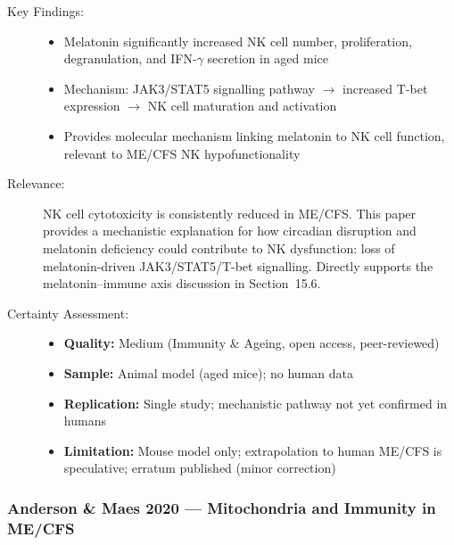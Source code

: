 \begin{description}
    \item[Key Findings:]
    \begin{itemize}
        \item Melatonin significantly increased NK cell number, proliferation, degranulation, and IFN-$\gamma$ secretion in aged mice
        \item Mechanism: JAK3/STAT5 signalling pathway $\rightarrow$ increased T-bet expression $\rightarrow$ NK cell maturation and activation
        \item Provides molecular mechanism linking melatonin to NK cell function, relevant to ME/CFS NK hypofunctionality
    \end{itemize}
    \item[Relevance:] NK cell cytotoxicity is consistently reduced in ME/CFS. This paper provides a mechanistic explanation for how circadian disruption and melatonin deficiency could contribute to NK dysfunction: loss of melatonin-driven JAK3/STAT5/T-bet signalling. Directly supports the melatonin--immune axis discussion in Section~15.6.
    \item[Certainty Assessment:]
    \begin{itemize}
        \item \textbf{Quality:} Medium (Immunity \& Ageing, open access, peer-reviewed)
        \item \textbf{Sample:} Animal model (aged mice); no human data
        \item \textbf{Replication:} Single study; mechanistic pathway not yet confirmed in humans
        \item \textbf{Limitation:} Mouse model only; extrapolation to human ME/CFS is speculative; erratum published (minor correction)
    \end{itemize}
\end{description}

\subsubsection*{Anderson \& Maes 2020 --- Mitochondria and Immunity in ME/CFS}


